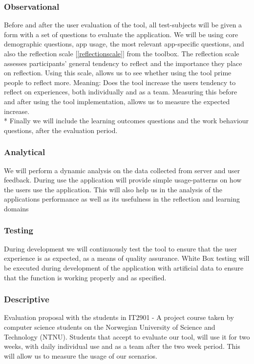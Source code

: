 \subsubsection{Observational}
Before and after the user evaluation of the tool, all test-subjects will be given a form with a set of questions to evaluate the application. We will be using core demographic questions, app usage, the most relevant app-specific questions, and also the reflection scale [\ref{reflectionscale}] from the toolbox. The reflection scale assesses participants' general tendency to reflect and the importance they place on reflection. Using this scale, allows us to see whether using the tool prime people to reflect more. Meaning: Does the tool increase the users tendency to reflect on experiences, both individually and as a team. Measuring this before and after using the tool implementation, allows us to measure the expected increase. \\*
Finally we will include the learning outcomes questions and the work behaviour questions, after the evaluation period.  

\subsubsection{Analytical}
We will perform a dynamic analysis on the data collected from server and user feedback. During use the application will provide simple usage-patterns on how the users use the application.
This will also help us in the analysis of the applications performance as well as its usefulness in the reflection and learning domains

\subsubsection{Testing}
During development we will continuously test the tool  to ensure that the user experience is as expected, as a means of quality assurance.
White Box testing will be executed during development of the application with artificial data to ensure that the function is working properly and as specified. 

\subsubsection{Descriptive}
Evaluation proposal with the students in IT2901 - A project course taken by computer science students on the Norwegian University of Science and Technology (NTNU). 
Students that accept to evaluate our tool, will use it for two weeks, with daily individual use and as a team after the two week period. This will allow us to measure the usage of our scenarios. 

